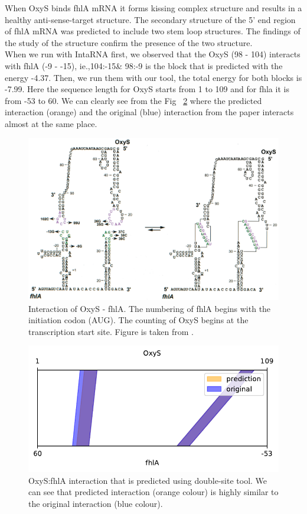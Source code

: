 \documentclass[twoside,a4paper]{report}
\numberwithin{equation}{section}
\begin{document}
	When OxyS binds fhlA mRNA it forms kissing complex structure and results in a healthy anti-sense-target structure. The secondary structure of the 5' end region of fhlA mRNA was predicted to include two stem loop structures. The findings of the study of the structure confirm the presence of the two structure. \\
	
	When we run with IntaRNA first, we observed that the OxyS (98 - 104) interacts with fhlA (-9 - -15), ie.,104:-15\& 98:-9 is the block that is predicted with the energy -4.37. Then, we run them with our tool, the total energy for both blocks is -7.99. Here the sequence length for OxyS starts from 1 to 109 and for fhla it is from -53 to 60. We can clearly see from the Fig ~\ref{fig:rricomparison1} where the predicted interaction (orange) and the original (blue) interaction from the paper interacts almost at the same place. \\
	


	\begin{figure}[h!tb]
	\includegraphics[width=1.0\linewidth]{oxys}
	\centering
	\caption{ Interaction of OxyS - fhlA. The numbering of fhlA begins with the initiation codon (AUG). The counting of OxyS begins at the transcription start site. Figure is taken from \citep{argaman2000fhla}. } 
	\label{fig:oxys}
	\end{figure}

\begin{figure}[h!tb]
	\centering
	\includegraphics[width=.4\linewidth]{rricomparison1.pdf}
	\caption{OxyS:fhlA interaction that is predicted using double-site tool. We can see that predicted interaction (orange colour) is highly similar to the original interaction (blue colour). }
	\label{fig:rricomparison1}
\end{figure}
\end{document}
